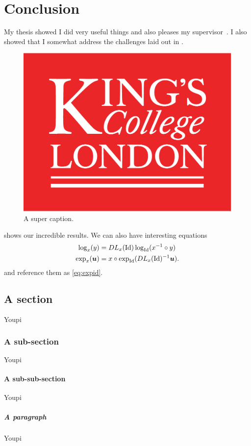 \chapter{Conclusion}
\label{chap:conclusion}
\minitoc


My thesis showed I did very useful things and also pleases my supervisor~\cite{Ourselin:MICCAI:00}. I also showed that I somewhat address the challenges laid out in .

\begin{figure}[htb!]
\centering
\includegraphics[width=0.60\linewidth]{figs/kcllogo}
\caption{A super caption.\label{fig:logo}}
\end{figure}

 shows our incredible results. We can also have interesting equations
\begin{align}
\log_x(y) &= DL_x(\operatorname{Id}) \log_{\operatorname{Id}}(x^{-1} \circ y) \label{eq:logid}\\
\exp_{x}(\boldsymbol{u}) &= x \circ \exp_{\operatorname{Id}}( DL_x(\operatorname{Id})^{-1} \boldsymbol{u} ).
\label{eq:expid}
\end{align}
and reference them as \eqref{eq:expid}.

\section{A section}
%
Youpi

\subsection{A sub-section}
%
Youpi

\subsubsection{A sub-sub-section}
%
Youpi

\paragraph{A paragraph}
%
Youpi

